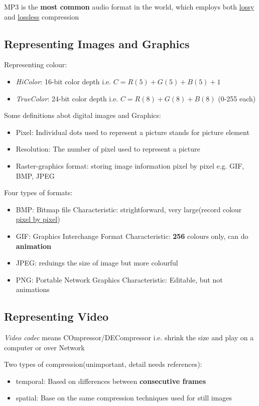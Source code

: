 \documentclass[12pt]{article}
\begin{document}
MP3 is the \textbf{most common} audio format in the world, which employs both \underline{lossy} and \underline{lossless} compression

\subsection{Representing Images and Graphics}
Representing colour:
\begin{itemize}
    \item \textit{HiColor}: 16-bit color depth\newline
    i.e. $C = R(5) + G(5) + B(5) + 1$
    \item \textit{TrueColor}: 24-bit color depth\newline
    i.e. $C = R(8) + G(8) + B(8)$  (0-255 each)
\end{itemize}

Some definitions abot digital images and Graphics:
\begin{itemize}
    \item Pixel: Individual dots used to represent a picture stands for picture element
    \item Resolution: The number of pixel used to represent a picture 
    \item Raster-graphics format: storing image information pixel by pixel \newline
    e.g. GIF, BMP, JPEG
\end{itemize}

Four types of formats:
\begin{itemize}
    \item BMP: Bitmap file\newline
    Characteristic: strightforward, very large(record colour \underline{pixel by pixel})
    \item GIF: Graphics Interchange Format\newline
    Characteristic: \textbf{256} colours only, can do \textbf{animation}
    \item JPEG: reduings the size of image but more colourful
    \item PNG: Portable Network Graphics\newline
    Characteristic: Editable, but not animations
\end{itemize}

\subsection{Representing Video}
\emph{Video codec} means COmpressor/DECompressor i.e. shrink the size and play on a computer or over Network

Two types of compression(unimportant, detail needs references):
\begin{itemize}
    \item temporal: Based on differences between \textbf{consecutive frames}
    \item spatial: Base on the same compression techniques used for still images
\end{itemize}
\end{document}
